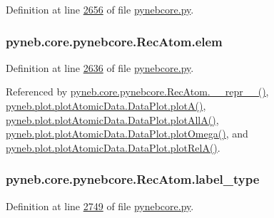 Definition at line \hyperlink{pynebcore_8py_source_l02656}{2656} of file \hyperlink{pynebcore_8py_source}{pynebcore.\-py}.

\hypertarget{classpyneb_1_1core_1_1pynebcore_1_1_rec_atom_a1325fff2854658752d522c7284df5a8a}{
\subsubsection[{elem}]{\setlength{\rightskip}{0pt plus 5cm}pyneb.\-core.\-pynebcore.\-Rec\-Atom.\-elem}}\label{classpyneb_1_1core_1_1pynebcore_1_1_rec_atom_a1325fff2854658752d522c7284df5a8a}


Definition at line \hyperlink{pynebcore_8py_source_l02636}{2636} of file \hyperlink{pynebcore_8py_source}{pynebcore.\-py}.



Referenced by \hyperlink{pynebcore_8py_source_l03154}{pyneb.\-core.\-pynebcore.\-Rec\-Atom.\-\_\-\-\_\-repr\-\_\-\-\_\-()}, \hyperlink{plot_atomic_data_8py_source_l00117}{pyneb.\-plot.\-plot\-Atomic\-Data.\-Data\-Plot.\-plot\-A()}, \hyperlink{plot_atomic_data_8py_source_l00189}{pyneb.\-plot.\-plot\-Atomic\-Data.\-Data\-Plot.\-plot\-All\-A()}, \hyperlink{plot_atomic_data_8py_source_l00373}{pyneb.\-plot.\-plot\-Atomic\-Data.\-Data\-Plot.\-plot\-Omega()}, and \hyperlink{plot_atomic_data_8py_source_l00262}{pyneb.\-plot.\-plot\-Atomic\-Data.\-Data\-Plot.\-plot\-Rel\-A()}.

\hypertarget{classpyneb_1_1core_1_1pynebcore_1_1_rec_atom_a054cc66819a590792e6a2478136e2143}{
\subsubsection[{label\-\_\-type}]{\setlength{\rightskip}{0pt plus 5cm}pyneb.\-core.\-pynebcore.\-Rec\-Atom.\-label\-\_\-type}}\label{classpyneb_1_1core_1_1pynebcore_1_1_rec_atom_a054cc66819a590792e6a2478136e2143}


Definition at line \hyperlink{pynebcore_8py_source_l02749}{2749} of file \hyperlink{pynebcore_8py_source}{pynebcore.\-py}.



